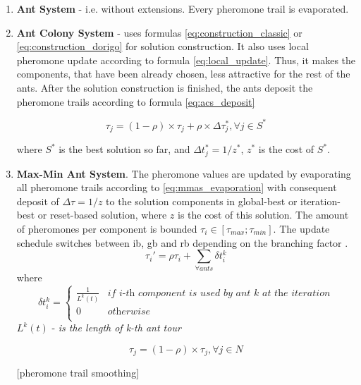 \documentclass[11pt,a4paper,oneside]{book}
\begin{document}
\begin{enumerate}
\item {\textbf{Ant System} - i.e. without extensions. Every pheromone trail is evaporated.}

\item {\textbf{Ant Colony System} - uses formulas \ref{eq:construction_classic} or \ref{eq:construction_dorigo} for solution construction. It also uses local pheromone update according to formula \ref{eq:local_update}. Thus, it makes the components, that have been already chosen, less attractive for the rest of the ants. After the solution construction is finished, the ants deposit the pheromone trails according to formula \ref{eq:acs_deposit}}

\begin{equation}
\tau_j = (1 - \rho) \times \tau_j + \rho \times \Delta \tau_j^*, \forall j \in S^*
\label{eq:acs_deposit}
\end{equation}

where $S^*$ is the best solution so far, and $\Delta t_j^* = 1/z^*$, $z^*$ is the cost of $S^*$.

\item \textbf{Max-Min Ant System}. The pheromone values are updated by evaporating all pheromone trails according to \ref{eq:mmas_evaporation} with consequent deposit of $\Delta \tau = 1 / z$ to the solution components in global-best or iteration-best or reset-based solution, where $z$ is the cost of this solution. The amount of pheromones per component is bounded $\tau_i \in [\tau_{max};\tau_{min}]$. The update schedule switches between ib, gb and rb depending on the branching factor \cite{mmas}.
\begin{equation}
\tau_i' = \rho \tau_i + \sum \limits_{\forall ants} \delta t_i^k
\end{equation}
where
\[
\delta t_i^k =
\left\{
\begin{array}{ll}
      \frac{1}{L^k(t)} & \textit{if i-th component is used by ant k at the iteration}\\
      0 & \textit{otherwise} \\
\end{array} 
\right. 
\]
$L^k(t)$ - \textit{is the length of k-th ant tour}


\begin{equation}
\tau_j = (1-\rho) \times \tau_j, \forall j \in N
\label{eq:mmas_evaporation}
\end{equation}

[pheromone trail smoothing]


\end{enumerate}
\end{document}
